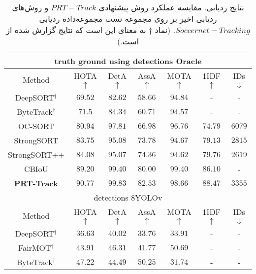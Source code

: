 
\begin{table*}[!htbp]
	\caption[نتایج ردیابی]{نتایج ردیابی. مقایسه عملکرد روش پیشنهادی $PRT-Track$ و روش‌های ردیابی اخیر بر روی مجموعه تست مجموعه‌داده ردیابی $Soccernet-Tracking$. (نماد $\dagger$ به معنای این است که نتایج گزارش شده از \cite{cioppa2022soccernet} است.)}
	\begin{center}
		\begin{tabular}{ |c|c|c|c|c|c|c| } 
			\hline
			\multicolumn{7}{|c|}{truth ground using detections Oracle} \\
			\hline
			Method  & HOTA $\uparrow$ & DetA $\uparrow$ &  AssA $\uparrow$ & MOTA $\uparrow$ &  1IDF $\uparrow$ &  IDs $\downarrow$ \\
			\hline
			DeepSORT$^{\dagger}$ &   $69.52$ & $82.62$ & $58.66$ & $94.84$ & - & - \\ 
			
			ByteTrack$^{\dagger}$  & $71.5$ & $84.34$ & $60.71$ & $94.57$ & -  & - \\ 
			
			OC-SORT  &$ 80.94$ & $97.81$ & $66.98$ & $96.76$ & $74.79$ & $6079$  \\ 
			
			StrongSORT  &  $83.75$ & $95.08$ & $73.78$ & $94.67$ & $79.13$ & $2815$ \\ 
			
			StrongSORT++  &  $84.08$ & $95.07$ & $74.36$ & $94.62$ & $79.76$ & \textbf{$2619$} \\ 
			
			CBIoU  &  $89.20$ & $99.40$ & $80.00$ & $99.40$ & $86.10$ & -\\ 
			
			\textbf{PRT-Track} &  \textbf{$90.77$} & \textbf{$99.83$} & \textbf{$82.53$} & \textbf{$98.66$} & \textbf{$88.47$} & $3355$\\ 
			
			\hline
			\hline
			\multicolumn{7}{|c|}{detections 8YOLOv } \\
			\hline
			Method  & HOTA $\uparrow$ & DetA $\uparrow$ &  AssA $\uparrow$ & MOTA $\uparrow$ &  1IDF $\uparrow$ &  IDs $\downarrow$ \\
			\hline
			DeepSORT$^{\dagger}$  & $36.63$ & $40.02$ & $33.76$ & $33.91$ & -  & -\\ 
			
			FairMOT$^{\dagger}$  & $43.91$ & $46.31$ & $41.77$ & $50.69$ & - & -\\ 
			
			ByteTrack$^{\dagger}$  &  $47.22$ & $44.49$ & $50.25$ & $31.74$ & -  & -\\ 
			

\end{tabular}
\end{center}
\end{table*}

